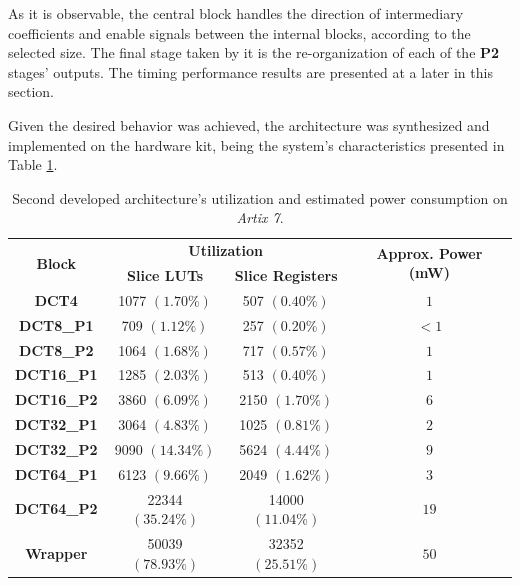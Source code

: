 As it is observable, the central block handles the direction of intermediary coefficients and enable signals between the internal blocks, according to the selected size. The final stage taken by it is the re-organization of each of the \textbf{P2} stages' outputs. The timing performance results are presented at a later in this section.

Given the desired behavior was achieved, the architecture was synthesized and implemented on the hardware kit, being the system's characteristics presented in Table \ref{tab:v2results}.

\begin{table}[!htpb]
    \centering
    \begin{tabular}{cccc} \toprule
        \multirow{2}{*}{\textbf{Block}}     & \multicolumn{2}{c}{\textbf{Utilization}}              & \multirow{2}{*}{\textbf{Approx. Power (mW)}}   \\
                                            & \textbf{Slice LUTs}      & \textbf{Slice Registers}   &                                                \\ \toprule
        \textbf{DCT4}                       & 1077 $(1.70\%)$          & 507 $(0.40\%)$             & $1$ \\
        \textbf{DCT8\_P1}                   & 709 $(1.12\%)$           & 257 $(0.20\%)$             & $<1$ \\
        \textbf{DCT8\_P2}                   & 1064 $(1.68\%)$          & 717 $(0.57\%)$             & $1$ \\
        \textbf{DCT16\_P1}                  & 1285 $(2.03\%)$          & 513 $(0.40\%)$             & $1$ \\
        \textbf{DCT16\_P2}                  & 3860 $(6.09\%)$          & 2150 $(1.70\%)$            & $6$ \\
        \textbf{DCT32\_P1}                  & 3064 $(4.83\%)$          & 1025 $(0.81\%)$            & $2$ \\
        \textbf{DCT32\_P2}                  & 9090 $(14.34\%)$         & 5624 $(4.44\%)$            & $9$ \\
        \textbf{DCT64\_P1}                  & 6123 $(9.66\%)$          & 2049 $(1.62\%)$            & $3$ \\
        \textbf{DCT64\_P2}                  & 22344 $(35.24\%)$        & 14000 $(11.04\%)$          & $19$ \\ \bottomrule
        \textbf{Wrapper}                    & 50039 $(78.93\%)$        & 32352 $(25.51\%)$          & $50$ \\
        \bottomrule
    \end{tabular}
    \caption{Second developed architecture's utilization and estimated power consumption on \emph{Artix 7}.}
    \label{tab:v2results}
\end{table}

